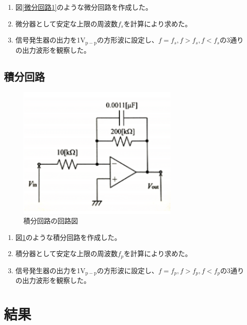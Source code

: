 \documentclass[a4paper,11pt,uplatex]{jsarticle}
\begin{document}
\begin{enumerate}
  \item 図\ref{微分回路1}のような微分回路を作成した。
  \item 微分器として安定な上限の周波数$f_s$を計算により求めた。
  \item 信号発生器の出力を1$\mathrm{V_{p-p}}$の方形波に設定し、$f=f_s,f>f_s,f<f_s$の3通りの出力波形を観察した。
\end{enumerate}

\subsection{積分回路}
\begin{figure}[H]
	\begin{center}
		\includegraphics[width=8cm]{画像/積分回路1.png}
		\caption{積分回路の回路図}
		\label{積分回路1}
	\end{center}
\end{figure}

\begin{enumerate}
  \item 図\ref{積分回路1}のような積分回路を作成した。
  \item 積分器として安定な上限の周波数$f_p$を計算により求めた。
  \item 信号発生器の出力を1$\mathrm{V_{p-p}}$の方形波に設定し、$f=f_p,f>f_p,f<f_p$の3通りの出力波形を観察した。
\end{enumerate}

\section{結果}
\end{document}
